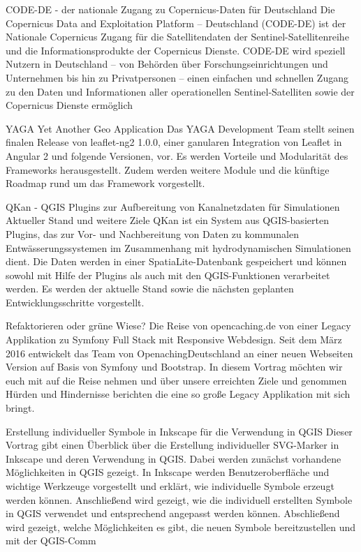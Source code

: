 %
{CODE-DE - der nationale Zugang zu Copernicus-Daten für Deutschland}%
{}%
{%
Die Copernicus Data and Exploitation Platform – Deutschland (CODE-DE) ist der Nationale Copernicus Zugang für die Satellitendaten der Sentinel-Satellitenreihe und die Informationsprodukte der Copernicus Dienste. CODE-DE wird speziell Nutzern in Deutschland – von Behörden über Forschungseinrichtungen und Unternehmen bis hin zu Privatpersonen – einen einfachen und schnellen Zugang zu den Daten und Informationen aller operationellen Sentinel-Satelliten sowie der Copernicus Dienste ermöglich%
}


%
{YAGA}%
{Yet Another Geo Application}%
{%
Das YAGA Development Team stellt seinen finalen Release von leaflet-ng2 1.0.0, einer ganularen Integration von Leaflet in Angular 2 und folgende Versionen, vor. Es werden Vorteile und Modularität des Frameworks herausgestellt. Zudem werden weitere Module und die künftige Roadmap rund um das Framework vorgestellt.%
}

%
{QKan - QGIS Plugins zur Aufbereitung von Kanalnetzdaten für Simulationen}%
{Aktueller Stand und weitere Ziele}%
{%
QKan ist ein System aus QGIS-basierten Plugins, das zur Vor- und Nachbereitung von Daten zu kommunalen Entwässerungssystemen im Zusammenhang mit hydrodynamischen Simulationen dient. Die Daten werden in einer SpatiaLite-Datenbank gespeichert und können sowohl mit Hilfe der Plugins als auch mit den QGIS-Funktionen verarbeitet werden. Es werden der aktuelle Stand sowie die nächsten geplanten Entwicklungsschritte vorgestellt.%
}

%
{Refaktorieren oder grüne Wiese?}%
{Die Reise von opencaching.de von einer Legacy Applikation zu Symfony Full Stack mit Responsive Webdesign.}%
{%
Seit dem März 2016 entwickelt das Team von OpenachingDeutschland an einer neuen Webseiten Version auf Basis von Symfony und Bootstrap. In diesem Vortrag möchten wir euch mit auf die Reise nehmen und über unsere erreichten Ziele und genommen Hürden und Hindernisse berichten die eine so große Legacy Applikation mit sich bringt.%
}


%
{Erstellung individueller Symbole in Inkscape für die Verwendung in QGIS}%
{}%
{%
Dieser Vortrag gibt einen Überblick über die Erstellung individueller SVG-Marker in Inkscape und deren Verwendung in QGIS. Dabei werden zunächst vorhandene Möglichkeiten in QGIS gezeigt. In Inkscape werden Benutzeroberfläche und wichtige Werkzeuge vorgestellt und erklärt, wie individuelle Symbole erzeugt werden können. Anschließend wird gezeigt, wie die individuell erstellten Symbole in QGIS verwendet und entsprechend angepasst werden können.
Abschließend wird gezeigt, welche Möglichkeiten es gibt, die neuen Symbole bereitzustellen und  mit der QGIS-Comm%
}

